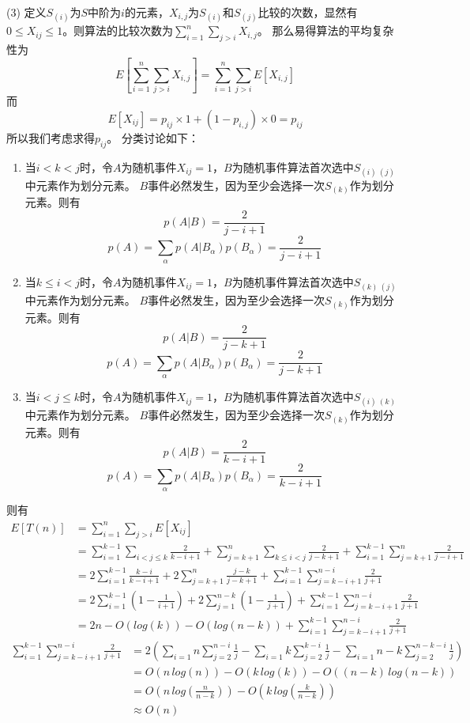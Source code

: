 (3)
定义$S_{(i)}$为$S$中阶为$i$的元素，$X_{i,j}$为$S_{(i)}$和$S_{(j)}$比较的次数，显然有$0 \le X_{ij} \le 1$。则算法的比较次数为$\sum_{i=1}^{n} \sum_{j>i} X_{i,j}$。
那么易得算法的平均复杂性为$$E[\sum_{i=1}^{n} \sum_{j>i} X_{i,j}]=\sum_{i=1}^{n} \sum_{j>i} E[X_{i,j}]$$
而$$E[X_{ij}]=p_{ij}\times 1+(1-p_{i,j}) \times 0=p_{ij}$$
所以我们考虑求得$p_{ij}$。
分类讨论如下：
\begin{enumerate}[1)]
\item 当$i<k<j$时，令$A$为随机事件$X_{ij}=1$，$B$为随机事件算法首次选中$S_{(i)~(j)}$中元素作为划分元素。
$B$事件必然发生，因为至少会选择一次$S_{(k)}$作为划分元素。则有
$$p(A|B)=\frac{2}{j-i+1}$$
$$p(A)=\sum_{\alpha}p(A|B_{\alpha})p(B_{\alpha})=\frac{2}{j-i+1}$$
\item 当$k \le i<j$时，令$A$为随机事件$X_{ij}=1$，$B$为随机事件算法首次选中$S_{(k)~(j)}$中元素作为划分元素。
$B$事件必然发生，因为至少会选择一次$S_{(k)}$作为划分元素。则有
$$p(A|B)=\frac{2}{j-k+1}$$
$$p(A)=\sum_{\alpha}p(A|B_{\alpha})p(B_{\alpha})=\frac{2}{j-k+1}$$
\item 当$i<j\le k$时，令$A$为随机事件$X_{ij}=1$，$B$为随机事件算法首次选中$S_{(i)~(k)}$中元素作为划分元素。
$B$事件必然发生，因为至少会选择一次$S_{(k)}$作为划分元素。则有
$$p(A|B)=\frac{2}{k-i+1}$$
$$p(A)=\sum_{\alpha}p(A|B_{\alpha})p(B_{\alpha})=\frac{2}{k-i+1}$$
\end{enumerate}
则有
\begin{align}  
    E[T(n)] &= \sum_{i=1}^{n}\sum_{j>i}E[X_{ij}] \nonumber\\
    &= \sum_{i=1}^{k-1}\sum_{i<j\le k}\frac{2}{k-i+1} +\sum_{j=k+1}^{n}\sum_{k\le i<j}\frac{2}{j-k+1}+\sum_{i=1}^{k-1}\sum_{j=k+1}^{n}\frac{2}{j-i+1} \nonumber\\
    &= 2\sum_{i=1}^{k-1}\frac{k-i}{k-i+1} + 2\sum_{j=k+1}^{n} \frac{j-k}{j-k+1} +\sum_{i=1}^{k-1}\sum_{j=k-i+1}^{n-i} \frac{2}{j+1} \nonumber\\
    &= 2\sum_{i=1}^{k-1} (1-\frac{1}{i+1}) + 2\sum_{j=1}^{n-k} (1-\frac{1}{j+1}) +\sum_{i=1}^{k-1}\sum_{j=k-i+1}^{n-i}\frac{2}{j+1} \nonumber\\
    &= 2n-O(log(k))-O(log(n-k)) + \sum_{i=1}^{k-1}\sum_{j=k-i+1}^{n-i} \frac{2}{j+1} \nonumber
\end{align}  
\begin{align}
    \sum_{i=1}^{k-1}\sum_{j=k-i+1}^{n-i} \frac{2}{j+1} &= 2(\sum_{i=1}{n}\sum_{j=2}^{n-i} \frac{1}{j} - \sum_{i=1}{k} \sum_{j=2}^{k-i} \frac{1}{j} - \sum_{i=1}{n-k} \sum_{j=2}^{n-k-i}\frac{1}{j}) \nonumber\\
    &= O(n\, log(n))-O(k\, log(k))-O((n-k)\, log(n-k)) \nonumber\\
    &= O(n\, log(\frac{n}{n-k}))-O(k\, log(\frac{k}{n-k})) \nonumber\\
    &\approx O(n) \nonumber
\end{align}

